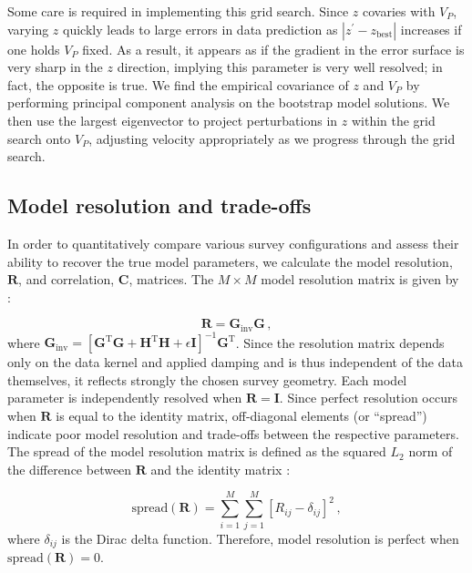Some care is required in implementing this grid search. Since $z$ covaries with $V_P$, varying $z$ quickly leads to large errors in data prediction as $|z^{\prime}-z_{{\text{best}}}|$ increases if one holds $V_P$ fixed. As a result, it appears as if the gradient in the error surface is very sharp in the $z$ direction, implying this parameter is very well resolved; in fact, the opposite is true. We find the empirical covariance of $z$ and $V_P$ by performing principal component analysis on the bootstrap model solutions. We then use the largest eigenvector to project perturbations in $z$ within the grid search onto $V_P$, adjusting velocity appropriately as we progress through the grid search. 

\subsection{Model resolution and trade-offs}
In order to quantitatively compare various survey configurations and assess their ability to recover the true model parameters, we calculate the model resolution, $\mathbf{R}$, and correlation, $\mathbf{C}$, matrices. The $M \times M$ model resolution matrix is given by \citep{Menke2018}:

\begin{equation}
\mathbf{R} = \mathbf{G}_{\text{inv}} \mathbf{G} \,,
\end{equation}
where $\mathbf{G}_{\text{inv}}= \left[ \mathbf{G}^{\text{T}} \mathbf{G} + \mathbf{H}^{\text{T}} \mathbf{H} + \epsilon\mathbf{I} \right]^{-1} \mathbf{G}^{\text{T}}$. Since the resolution matrix depends only on the data kernel and applied damping and is thus independent of the data themselves, it reflects strongly the chosen survey geometry. Each model parameter is independently resolved when $\mathbf{R}=\mathbf{I}$. Since perfect resolution occurs when $\mathbf{R}$ is equal to the identity matrix, off-diagonal elements (or ``spread'') indicate poor model resolution and trade-offs between the respective parameters. The spread of the model resolution matrix is defined as the squared $L_2$ norm of the difference between $\mathbf{R}$ and the identity matrix \citep{Menke2018}:

\begin{equation}
\text{spread}(\mathbf{R}) = \sum_{i=1}^M\sum_{j=1}^M \left[ R_{ij}-\delta_{ij}\right]^2 \,,
\end{equation}
where $\delta_{ij}$ is the Dirac delta function. Therefore, model resolution is perfect when $\text{spread}(\mathbf{R})=0$.


